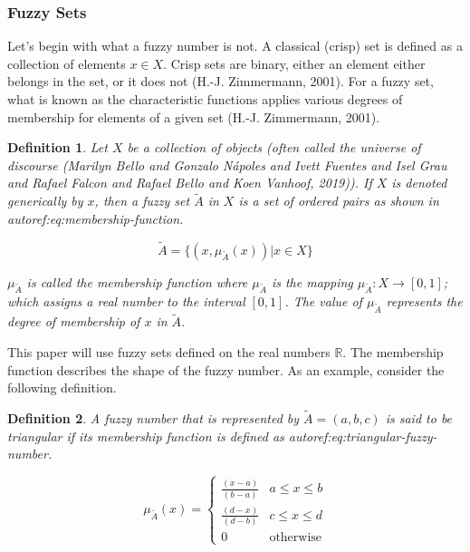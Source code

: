 \documentclass[11pt,a4paper,final]{article}
\newtheorem{definition}{Definition}[section]
\begin{document}
\subsubsection{Fuzzy Sets}
\label{sec:org99f2be1}
Let's begin with what a fuzzy number is not. A classical (crisp) set is defined as a collection of elements \(x \in X\).
Crisp sets are binary, either an element either belongs in the set, or it does not (H.-J. Zimmermann, 2001).
For a fuzzy set, what is known as the characteristic functions applies various degrees of membership for elements of a
given set (H.-J. Zimmermann, 2001).

\begin{definition}
Let \(X\) be a collection of objects (often called the universe of discourse (Marilyn Bello and Gonzalo N{\'a}poles and Ivett Fuentes and Isel Grau and Rafael Falcon and Rafael Bello and Koen Vanhoof, 2019)). If \(X\) is denoted
generically by \(x\), then a fuzzy set \(\tilde{A}\) in \(X\) is a set of ordered pairs as shown in autoref:eq:membership-function.

\begin{equation}
\label{eq:membership-function}
\tilde{A} = \{(x, \mu_{\tilde{A}}(x))| x\in X\}
\end{equation}

\noindent
\(\mu_{\tilde{A}}\) is called the membership function where \(\mu_{\tilde{A}}\) is the mapping \(\mu_{\tilde{A}} : X \rightarrow
[0,1]\); which assigns a real number to the interval \([0,1]\). The value of \(\mu_{\tilde{A}}\) represents the degree of
membership of \(x\) in \(\tilde{A}\).
\end{definition}

This paper will use fuzzy sets defined on the real numbers \(\mathbb{R}\). The membership function describes the shape of
the fuzzy number. As an example, consider the following definition.

\begin{definition}
A fuzzy number that is represented by \(\tilde{A} = (a,b,c)\) is said to be triangular if its membership function is
defined as autoref:eq:triangular-fuzzy-number.

\begin{equation}
\label{eq:triangular-fuzzy-number}
  \mu_{\tilde{A}}(x) =
  \begin{cases}
    \frac{(x-a)}{(b-a)} & a \le x \le b \\
    \frac{(d-x)}{(d-b)} & c \le x \le d \\
    0                   & \text{otherwise}
  \end{cases}
\end{equation}
\end{definition}
\end{document}
